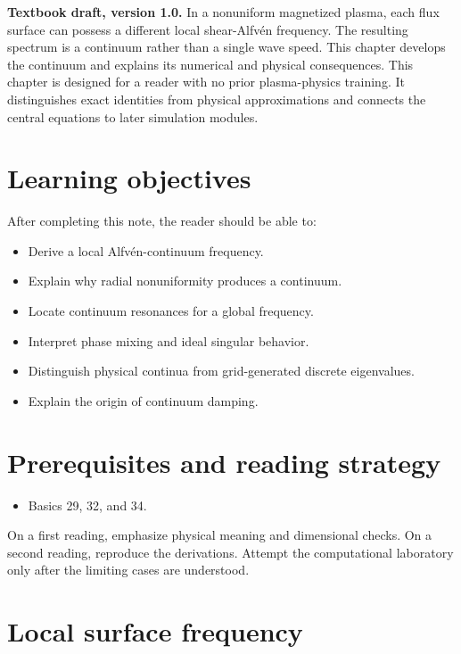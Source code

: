 \documentclass[11pt]{article}
\begin{document}

\begin{overviewbox}
\textbf{Textbook draft, version 1.0.} In a nonuniform magnetized plasma, each flux surface can possess a different local shear-Alfvén frequency. The resulting spectrum is a continuum rather than a single wave speed. This chapter develops the continuum and explains its numerical and physical consequences. This chapter is designed for a reader with no prior plasma-physics training. It distinguishes exact identities from physical approximations and connects the central equations to later simulation modules.
\end{overviewbox}

\ProjectTOC

\section{Learning objectives}
After completing this note, the reader should be able to:
\begin{itemize}[leftmargin=1.6em]
\item Derive a local Alfvén-continuum frequency.
\item Explain why radial nonuniformity produces a continuum.
\item Locate continuum resonances for a global frequency.
\item Interpret phase mixing and ideal singular behavior.
\item Distinguish physical continua from grid-generated discrete eigenvalues.
\item Explain the origin of continuum damping.
\end{itemize}

\section{Prerequisites and reading strategy}
\begin{itemize}[leftmargin=1.6em]
\item Basics 29, 32, and 34.
\end{itemize}
On a first reading, emphasize physical meaning and dimensional checks. On a second reading, reproduce the derivations. Attempt the computational laboratory only after the limiting cases are understood.

\section{Local surface frequency}
\end{document}
